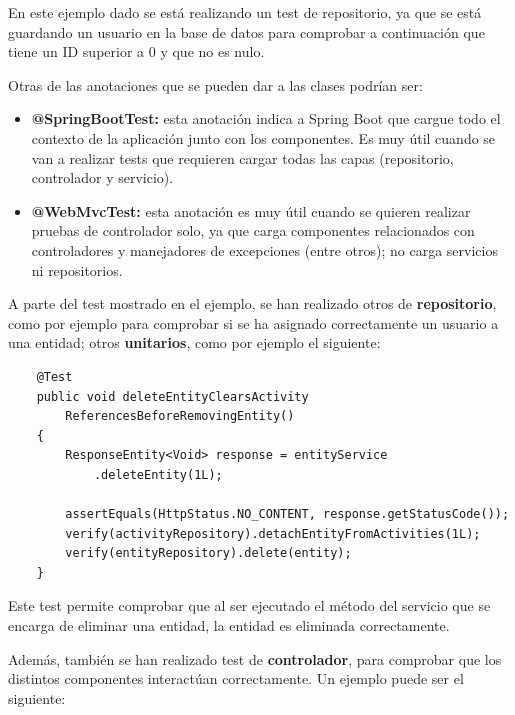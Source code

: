 En este ejemplo dado se está realizando un test de repositorio, ya que se está guardando un usuario en la base de datos para comprobar a continuación que tiene un ID superior a 0 y que no es nulo.

Otras de las anotaciones que se pueden dar a las clases podrían ser:

\begin{itemize}
    \item \textbf{@SpringBootTest:} esta anotación indica a Spring Boot que cargue todo el contexto de la aplicación junto con los componentes. Es muy útil cuando se van a realizar tests que requieren
    cargar todas las capas (repositorio, controlador y servicio).

    \item \textbf{@WebMvcTest:} esta anotación es muy útil cuando se quieren realizar pruebas de controlador solo, ya que carga componentes relacionados con controladores y manejadores de excepciones
    (entre otros); no carga servicios ni repositorios.
\end{itemize}

A parte del test mostrado en el ejemplo, se han realizado otros de \textbf{repositorio}, como por ejemplo para comprobar si se ha asignado correctamente un usuario a una entidad; otros \textbf{unitarios}, como por
ejemplo el siguiente:

\begin{verbatim}
    @Test
    public void deleteEntityClearsActivity
        ReferencesBeforeRemovingEntity() 
    {
        ResponseEntity<Void> response = entityService
            .deleteEntity(1L);

        assertEquals(HttpStatus.NO_CONTENT, response.getStatusCode());
        verify(activityRepository).detachEntityFromActivities(1L);
        verify(entityRepository).delete(entity);
    }
\end{verbatim}

Este test permite comprobar que al ser ejecutado el método del servicio que se encarga de eliminar una entidad, la entidad es eliminada correctamente.

Además, también se han realizado test de \textbf{controlador}, para comprobar que los distintos componentes interactúan correctamente. Un ejemplo puede ser el siguiente:

